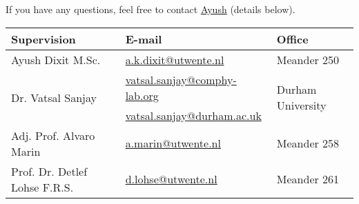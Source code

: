 \documentclass[a4paper,10pt]{article}
\begin{document}
If you have any questions, feel free to contact \href{mailto:a.k.dixit@utwente.nl}{Ayush} (details below).
\begin{center}
\begin{tabular}{|l|l|l|}
\hline \textbf{Supervision} & \textbf{E-mail} & \textbf{Office} \\
\hline Ayush Dixit M.Sc. & \href{mailto:a.k.dixit@utwente.nl}{a.k.dixit@utwente.nl} & Meander 250 \\
\hline \multirow{2}{*}{Dr. Vatsal Sanjay} & \href{mailto:vatsal.sanjay@comphy-lab.org}{vatsal.sanjay@comphy-lab.org} & \multirow{2}{*}{Durham University} \\
& \href{mailto:vatsal.sanjay@durham.ac.uk}{vatsal.sanjay@durham.ac.uk} & \\
\hline Adj. Prof. Alvaro Marin & \href{mailto:a.marin@utwente.nl}{a.marin@utwente.nl} & Meander 258 \\
\hline Prof. Dr. Detlef Lohse F.R.S. & \href{mailto:d.lohse@utwente.nl}{d.lohse@utwente.nl} & Meander 261  \\
\hline
\end{tabular}
\end{center}
\printbibliography
\end{document}
